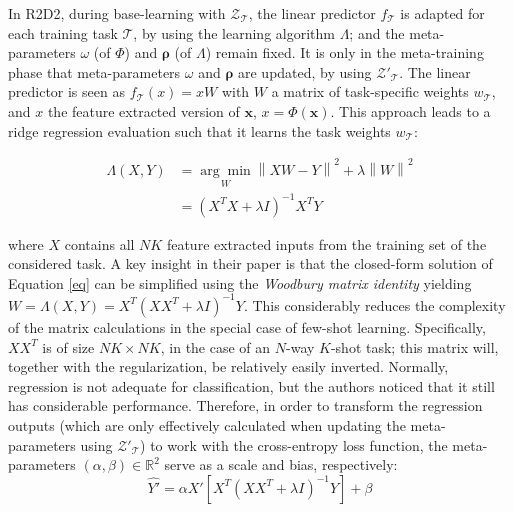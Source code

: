 In R2D2, during base-learning with $\mathcal{Z}_\mathcal{T}$, the linear predictor $f_\mathcal{T}$ is adapted for each training task $\mathcal{T}$, by using the learning algorithm $\Lambda$; and the meta-parameters $\omega$ (of $\Phi$) and $\bm{\rho}$ (of $\Lambda$) remain fixed. It is only in the meta-training phase that meta-parameters $\omega$ and $\bm{\rho}$ are updated, by using $\mathcal{Z}'_\mathcal{T}$. The linear predictor is seen as $f_\mathcal{T}(x)=xW$ with $W$ a matrix of task-specific weights $w_\mathcal{T}$, and $x$ the feature extracted version of $\bm{x}$, $x = \Phi(\bm{x})$. This approach leads to a ridge regression evaluation such that it learns the task weights  $w_\mathcal{T}$:

\newcommand{\norm}[1]{\left\lVert#1\right\rVert}
\begin{align}
\Lambda(X,Y) &= \underset{W}{\arg\min} \norm{XW-Y}^2 + \lambda\norm{W}^2 \\
&= (X^TX+\lambda I)^{-1}X^TY \label{eq}
\end{align}

where $X$ contains all $NK$ feature extracted inputs from the training set of the considered task. A key insight in their paper is that the closed-form solution of Equation \ref{eq} can be simplified using the \textit{Woodbury matrix identity} yielding $W = \Lambda(X,Y) = X^T(XX^T+\lambda I)^{-1}Y$. This considerably reduces the complexity of the matrix calculations in the special case of few-shot learning. Specifically, $XX^T$ is of size $NK\times NK$, in the case of an $N$-way $K$-shot task; this matrix will, together with the regularization, be relatively easily inverted. Normally, regression is not adequate for classification, but the authors noticed that it still has considerable performance. Therefore, in order to transform the regression outputs (which are only effectively calculated when updating the meta-parameters using $\mathcal{Z}'_\mathcal{T}$)  to work with the cross-entropy loss function, the meta-parameters $(\alpha, \beta) \in \mathbb{R}^2$ serve as a scale and bias, respectively:
\begin{equation}
\hat{Y'} = \alpha X'\left[ X^T(XX^T+\lambda I)^{-1} Y\right] + \beta
\label{wood}
\end{equation}

